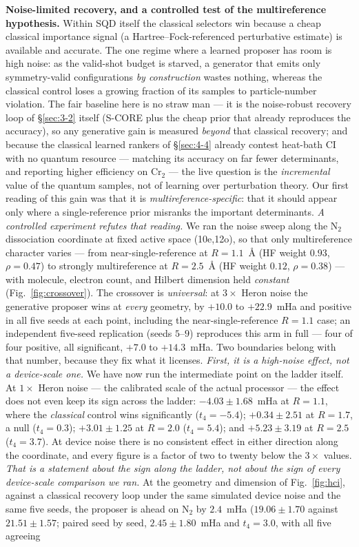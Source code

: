 \documentclass[onecolumn,a4paper]{quantumarticle}
\begin{document}
\textbf{Noise-limited recovery, and a controlled test of the multireference hypothesis.} Within SQD itself the classical selectors win because a cheap classical importance signal (a Hartree--Fock-referenced perturbative estimate) is available and accurate. The one regime where a learned proposer has room is high noise: as the valid-shot budget is starved, a generator that emits only symmetry-valid configurations \emph{by construction} wastes nothing, whereas the classical control loses a growing fraction of its samples to particle-number violation. The fair baseline here is no straw man --- it is the noise-robust recovery loop of \S\ref{sec:3-2} itself (S-CORE plus the cheap prior that already reproduces the accuracy), so any generative gain is measured \emph{beyond} that classical recovery; and because the classical learned rankers of \S\ref{sec:4-4} already contest heat-bath CI with no quantum resource --- matching its accuracy on far fewer determinants, and reporting higher efficiency on Cr$_2$ --- the live question is the \emph{incremental} value of the quantum samples, not of learning over perturbation theory. Our first reading of this gain was that it is \emph{multireference-specific}: that it should appear only where a single-reference prior misranks the important determinants. \emph{A controlled experiment refutes that reading.} We ran the noise sweep along the N$_2$ dissociation coordinate at fixed active space (10e,12o), so that only multireference character varies --- from near-single-reference at $R{=}1.1$~\AA{} (HF weight $0.93$, $\rho{=}0.47$) to strongly multireference at $R{=}2.5$~\AA{} (HF weight $0.12$, $\rho{=}0.38$) --- with molecule, electron count, and Hilbert dimension held \emph{constant} (Fig.~\ref{fig:crossover}). The crossover is \emph{universal}: at $3\times$ Heron noise the generative proposer wins at \emph{every} geometry, by $+10.0$ to $+22.9$~mHa and positive in all five seeds at each point, including the near-single-reference $R{=}1.1$ case; an independent five-seed replication (seeds $5$--$9$) reproduces this arm in full --- four of four positive, all significant, $+7.0$ to $+14.3$~mHa. Two boundaries belong with that number, because they fix what it licenses. \emph{First, it is a high-noise effect, not a device-scale one.} We have now run the intermediate point on the ladder itself. At $1\times$ Heron noise --- the calibrated scale of the actual processor --- the effect does not even keep its sign across the ladder: $-4.03\pm1.68$~mHa at $R{=}1.1$, where the \emph{classical} control wins significantly ($t_4{=}-5.4$); $+0.34\pm2.51$ at $R{=}1.7$, a null ($t_4{=}0.3$); $+3.01\pm1.25$ at $R{=}2.0$ ($t_4{=}5.4$); and $+5.23\pm3.19$ at $R{=}2.5$ ($t_4{=}3.7$). At device noise there is no consistent effect in either direction along the coordinate, and every figure is a factor of two to twenty below the $3\times$ values. \emph{That is a statement about the sign along the ladder, not about the sign of every device-scale comparison we ran.} At the geometry and dimension of Fig.~\ref{fig:hci}, against a classical recovery loop under the same simulated device noise and the same five seeds, the proposer is ahead on N$_2$ by $2.4$~mHa ($19.06\pm1.70$ against $21.51\pm1.57$; paired seed by seed, $2.45\pm1.80$~mHa and $t_{4}{=}3.0$, with all five agreeing 
\end{document}
